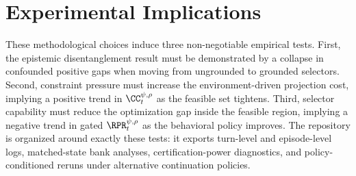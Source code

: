 \section{Experimental Implications}

These methodological choices induce three non-negotiable empirical tests. First, the epistemic disentanglement result must be demonstrated by a collapse in confounded positive gaps when moving from ungrounded to grounded selectors. Second, constraint pressure must increase the environment-driven projection cost, implying a positive trend in $\CC_t^{\psi,\rho}$ as the feasible set tightens. Third, selector capability must reduce the optimization gap inside the feasible region, implying a negative trend in gated $\RPR_t^{\psi,\rho}$ as the behavioral policy improves. The repository is organized around exactly these tests: it exports turn-level and episode-level logs, matched-state bank analyses, certification-power diagnostics, and policy-conditioned reruns under alternative continuation policies.
